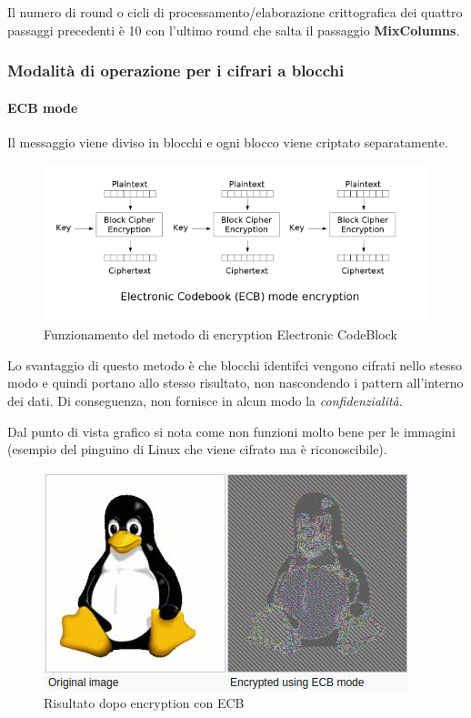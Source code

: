 Il numero di round o cicli di processamento/elaborazione crittografica dei quattro passaggi precedenti è 10 con l'ultimo round che salta il passaggio \textbf{MixColumns}.

\subsubsection{Modalità di operazione per i cifrari a blocchi}

\paragraph{ECB mode}

Il messaggio viene diviso in blocchi e ogni blocco viene criptato separatamente.

\begin{figure}[H]
\centering
\includegraphics[scale=0.65]{res/img/ecb.png}
\caption{Funzionamento del metodo di encryption Electronic CodeBlock}
\label{fig:password:ecb}
\end{figure}

Lo svantaggio di questo metodo è che blocchi identifci vengono cifrati nello 
stesso modo e quindi portano allo stesso risultato, non nascondendo i pattern 
all'interno dei dati. Di conseguenza, non fornisce in alcun modo la 
\textit{confidenzialità}.

Dal punto di vista grafico si nota come non funzioni molto bene per le 
immagini (esempio del pinguino di Linux che viene cifrato ma è riconoscibile).

\begin{figure}[H]
\centering
\includegraphics[scale=0.65]{res/img/password_linux.png}
\caption{Risultato dopo encryption con ECB}
\label{fig:password:linux_ecb}
\end{figure}

